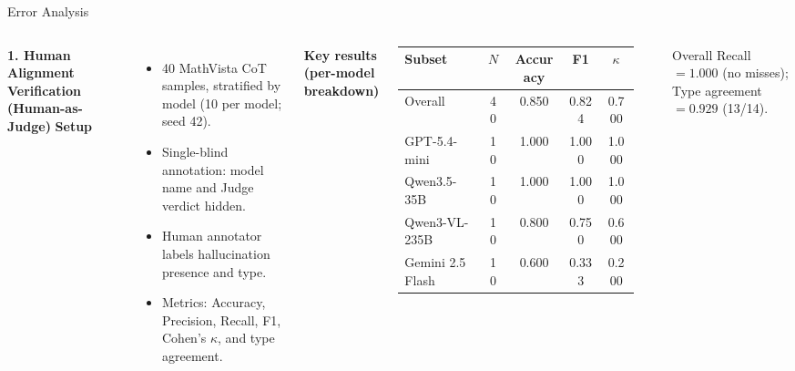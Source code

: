 \documentclass[9pt,aspectratio=169]{beamer}
\begin{document}
\begin{frame}{Error Analysis}
  \begin{columns}[c,onlytextwidth]
      \textbf{\small 1. Human Alignment Verification (Human-as-Judge) }
      \vspace{0.15em}
      \textbf{\footnotesize Setup}
      \scriptsize
      \begin{itemize}\setlength{\itemsep}{0.06em}
        \item 40 MathVista CoT samples, stratified by model
              (10 per model; seed 42).
        \item Single-blind annotation:
              model name and Judge verdict hidden.
        \item Human annotator labels hallucination presence and type.
        \item Metrics: Accuracy, Precision, Recall, F1,
              Cohen's $\kappa$, and type agreement.
      \end{itemize}

      \vspace{0.1em}
      {\raggedright\textbf{\footnotesize Key results (per-model breakdown)}\par}
      \centering
      \scriptsize
      \setlength{\tabcolsep}{3.5pt}
      \renewcommand{\arraystretch}{0.85}
      \begin{tabular}{l c ccc}
        \toprule
        Subset & $N$ & Accuracy & F1 & $\kappa$ \\
        \midrule
        \rowcolor{pink!50}
        Overall          & 40 & 0.850 & 0.824 & 0.700 \\
        \midrule
        GPT-5.4-mini     & 10 & \alert{1.000} & \alert{1.000} & \alert{1.000} \\
        Qwen3.5-35B      & 10 & \alert{1.000} & \alert{1.000} & \alert{1.000} \\
        Qwen3-VL-235B    & 10 & 0.800 & 0.750 & 0.600 \\
        Gemini 2.5 Flash & 10 & 0.600 & 0.333 & 0.200 \\
        \bottomrule
      \end{tabular}\\[0.15em]
      {\scriptsize\raggedright Overall Recall $= 1.000$ (no misses);
       Type agreement $= 0.929$ (13/14).\par}


\end{columns}
\end{frame}
\end{document}
